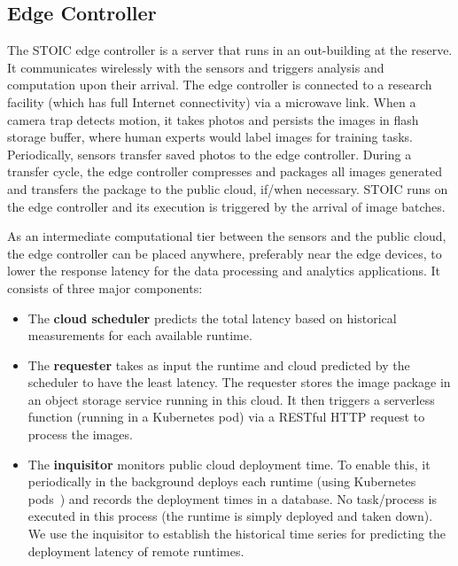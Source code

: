 \subsection{Edge Controller} 

The STOIC edge controller is a server that runs in an
out-building at the reserve. It communicates wirelessly with the sensors and triggers analysis and computation upon their arrival. The edge controller is connected to a research facility (which has full Internet connectivity) 
via a microwave link. When a camera trap detects motion, it takes photos and persists the images in flash storage buffer, where human experts would label images for training tasks. Periodically, sensors transfer saved photos to the edge controller. During a transfer cycle, the edge controller compresses and packages all images generated and transfers the package to the public cloud, if/when necessary. STOIC runs on the edge controller and its execution is triggered by the arrival of image batches. 

As an intermediate computational tier between the sensors and the public cloud, the edge controller can be placed anywhere, preferably near the edge devices, to lower the response latency for the data processing and analytics applications. It consists of three major components: 
\begin{itemize}
\item The \textbf{cloud scheduler} predicts the total latency based on historical measurements for each available runtime. 
\item The \textbf{requester} takes as input the runtime and cloud predicted by the scheduler to have the least latency.  The requester stores the image package in an object storage service running in this cloud. It then triggers a serverless function (running in a Kubernetes pod) via a RESTful HTTP request to process the images.
\item The \textbf{inquisitor} monitors public cloud deployment time. To enable this, it periodically in the background deploys each runtime (using Kubernetes pods~\cite{ref:pods}) and records the deployment times in a database. No task/process is executed in this process (the runtime is simply deployed and taken down). We use the inquisitor to establish the historical time series for predicting the deployment latency of remote runtimes.
\end{itemize}

